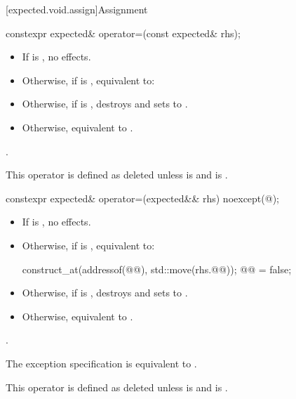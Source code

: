 [expected.void.assign]{Assignment}

%
\begin{itemdecl}
constexpr expected& operator=(const expected& rhs);
\end{itemdecl}

\begin{itemdescr}
\pnum
\effects
\begin{itemize}
\item
If  is , no effects.
\item
Otherwise, if  is ,
equivalent to: 
\item
Otherwise, if  is ,
destroys  and sets  to .
\item
Otherwise, equivalent to .
\end{itemize}

\pnum
\returns
{}.

\pnum
\remarks
This operator is defined as deleted unless
 is  and
 is .
\end{itemdescr}

%
\begin{itemdecl}
constexpr expected& operator=(expected&& rhs) noexcept(@\seebelow@);
\end{itemdecl}

\begin{itemdescr}
\pnum
\effects
\begin{itemize}
\item
If  is , no effects.
\item
Otherwise, if  is , equivalent to:
\begin{codeblock}
construct_at(addressof(@@), std::move(rhs.@@));
@@ = false;
\end{codeblock}
\item
Otherwise, if  is ,
destroys  and sets  to .
\item
Otherwise, equivalent to .
\end{itemize}

\pnum
\returns
{}.

\pnum
\remarks
The exception specification is equivalent to
.

\pnum
This operator is defined as deleted unless
 is  and
 is .
\end{itemdescr}

